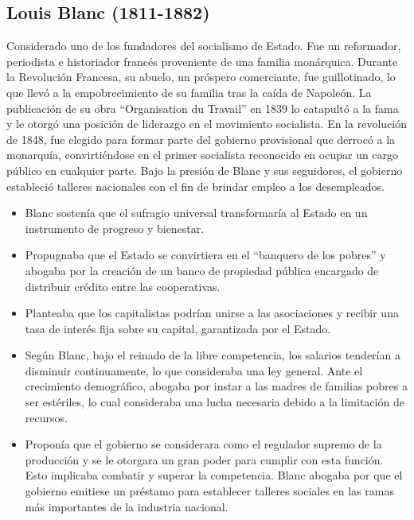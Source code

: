 \documentclass[
  jou,
  floatsintext,
  longtable,
  a4paper,
  nolmodern,
  notxfonts,
  notimes,
  12pt,
  colorlinks=true,linkcolor=blue,citecolor=blue,urlcolor=blue]{apa7}
\providecommand{\tightlist}{%
  \setlength{\itemsep}{0pt}\setlength{\parskip}{0pt}}
\begin{document}
\subsection{Louis Blanc (1811-1882)}\label{louis-blanc-1811-1882}

Considerado uno de los fundadores del socialismo de Estado. Fue un
reformador, periodista e historiador francés proveniente de una familia
monárquica. Durante la Revolución Francesa, su abuelo, un próspero
comerciante, fue guillotinado, lo que llevó a la empobrecimiento de su
familia tras la caída de Napoleón. La publicación de su obra
``Organisation du Travail'' en 1839 lo catapultó a la fama y le otorgó
una posición de liderazgo en el movimiento socialista. En la revolución
de 1848, fue elegido para formar parte del gobierno provisional que
derrocó a la monarquía, convirtiéndose en el primer socialista
reconocido en ocupar un cargo público en cualquier parte. Bajo la
presión de Blanc y sus seguidores, el gobierno estableció talleres
nacionales con el fin de brindar empleo a los desempleados.

\begin{itemize}
\tightlist
\item
  Blanc sostenía que el sufragio universal transformaría al Estado en un
  instrumento de progreso y bienestar.
\item
  Propugnaba que el Estado se convirtiera en el ``banquero de los
  pobres'' y abogaba por la creación de un banco de propiedad pública
  encargado de distribuir crédito entre las cooperativas.
\item
  Planteaba que los capitalistas podrían unirse a las asociaciones y
  recibir una tasa de interés fija sobre su capital, garantizada por el
  Estado.
\item
  Según Blanc, bajo el reinado de la libre competencia, los salarios
  tenderían a disminuir continuamente, lo que consideraba una ley
  general. Ante el crecimiento demográfico, abogaba por instar a las
  madres de familias pobres a ser estériles, lo cual consideraba una
  lucha necesaria debido a la limitación de recursos.
\item
  Proponía que el gobierno se considerara como el regulador supremo de
  la producción y se le otorgara un gran poder para cumplir con esta
  función. Esto implicaba combatir y superar la competencia. Blanc
  abogaba por que el gobierno emitiese un préstamo para establecer
  talleres sociales en las ramas más importantes de la industria
  nacional.
\end{itemize}
\end{document}
